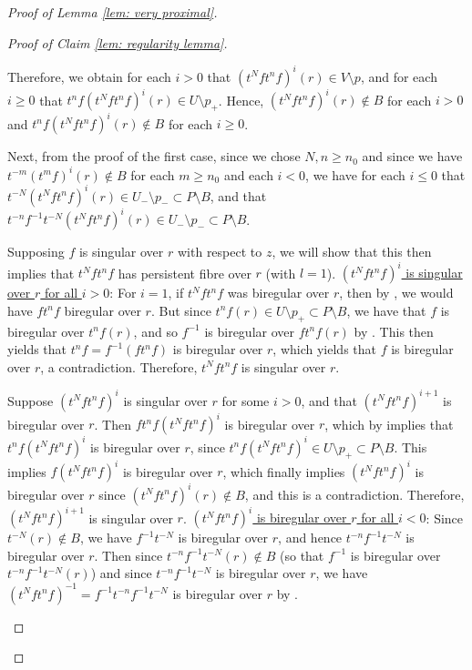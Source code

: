 \documentclass[12pt]{article}
\newcommand{\vs}{\vskip10pt}
\theoremstyle{definition}
\begin{document}
\begin{proof} [Proof of Lemma \ref{lem: very proximal}]
\begin{proof}[Proof of Claim \ref{lem: regularity lemma}]
\begin{enumerate}
        Therefore, we obtain for each $i > 0$ that $(t^N f t^n f)^i(r) \in V \setminus p$, and for each $i \geq 0$ that $t^nf(t^N f t^n f)^i(r) \in U \setminus p_+$. Hence, $(t^N f t^n f)^i(r) \notin B$ for each $i > 0$ and $t^nf(t^N f t^n f)^i(r) \notin B$ for each $i \geq 0$. 

        Next, from the proof of the first case, since we chose $N,n \geq n_0$ and since we have \newline $t^{-m}(t^m f)^{i}(r) \notin B$ for each $m \geq n_0$ and each $i < 0$, we have for each $i \leq 0$ that \newline $t^{-N}(t^N f t^n f)^{i}(r) \in U_- \setminus p_- \subset P \setminus B$, and that $t^{-n}f^{-1}t^{-N}(t^N f t^n f)^{i}(r) \in U_- \setminus p_- \subset P \setminus B$. 

        Supposing $f$ is singular over $r$ with respect to $z$, we will show that this then implies that $t^N f t^n f$ has persistent fibre over $r$ (with $l = 1$). 
\vs \vs
        \underline{$(t^N f t^n f)^i$ is singular over $r$ for all $i > 0$}: 
\vs
        For $i = 1$, if $t^N f t^n f$ was biregular over $r$, then by \cite[Remark 4.4]{Algebraic}, we would have $f t^n f$ biregular over $r$. But since $t^n f (r) \in U \setminus p_+ \subset P \setminus B$, we have that $f$ is biregular over $t^n f(r)$, and so $f^{-1}$ is biregular over $f t^n f(r)$ by \cite[Remark 4.4]{Algebraic}. This then yields that $t^n f = f^{-1} (ft^n f)$ is biregular over $r$, which yields that $f$ is biregular over $r$, a contradiction. Therefore, $t^N f t^n f$ is singular over $r$. 

        Suppose $(t^N f t^n f)^i$ is singular over $r$ for some $i > 0$, and that $(t^N f t^n f)^{i+1}$ is biregular over $r$. Then $ft^n f (t^N f t^n f)^i$ is biregular over $r$, which by \cite[Remark 4.4]{Algebraic} implies that $t^n f (t^N f t^n f)^i$ is biregular over $r$, since $t^n f (t^N f t^n f)^i \in U \setminus p_+ \subset P \setminus B$. This implies $f (t^N f t^n f)^i$ is biregular over $r$, which finally implies $(t^N f t^n f)^i$ is biregular over $r$ since $(t^N f t^n f)^i (r)\notin B$, and this is a contradiction. Therefore, $(t^N f t^n f)^{i+1}$ is singular over $r$.
\vs
        \underline{$(t^N f t^n f)^i$ is biregular over $r$ for all $i < 0$}: 
\vs
        Since $t^{-N}(r) \notin B$, we have $f^{-1}t^{-N}$ is biregular over $r$, and hence $t^{-n}f^{-1}t^{-N}$ is biregular over $r$. Then since $t^{-n}f^{-1}t^{-N}(r) \notin B$ (so that $f^{-1}$ is biregular over $t^{-n}f^{-1}t^{-N}(r)$) and since $t^{-n}f^{-1}t^{-N}$ is biregular over $r$, we have $(t^N f t^n f)^{-1} = f^{-1}t^{-n}f^{-1}t^{-N}$ is biregular over $r$ by \cite[Remark 4.4]{Algebraic}. 


\end{enumerate}
\end{proof}
\end{proof}
\end{document}
